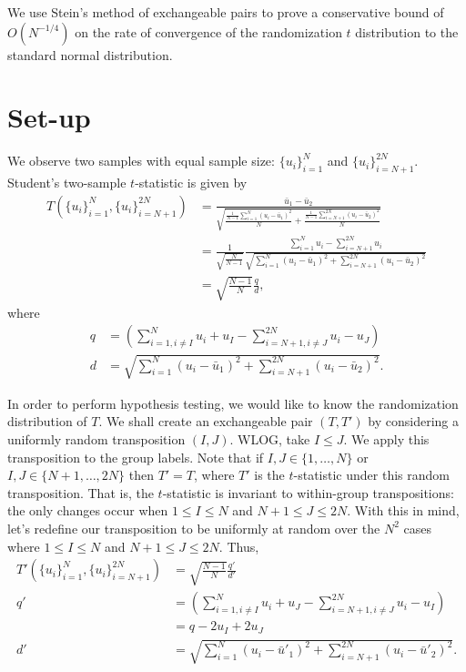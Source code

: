 We use Stein's method of exchangeable pairs to prove a conservative bound of $O(N^{-1/4})$ on the
rate of convergence of the randomization $t$ distribution to the standard normal distribution.

\section{Set-up}
We observe two samples with equal sample size: $\{u_i\}_{i=1}^N$ and $\{u_i\}_{i=N+1}^{2N}$.
Student's two-sample $t$-statistic is given by
\begin{align*}
T(\{u_i\}_{i=1}^N, \{u_i\}_{i=N+1}^{2N}) 
&= \frac{\bar{u}_1 - \bar{u}_2}{\sqrt{\frac{\frac{1}{N-1}
      \sum_{i=1}^N(u_i - \bar{u}_1)^2}{N} + \frac{\frac{1}{N-1}
      \sum_{i=N+1}^{2N}(u_i - \bar{u}_2)^2}{N}}} \\
&= \frac{1}{\sqrt{\frac{N}{N-1}}} \frac{\sum_{i=1}^N u_i -
  \sum_{i=N+1}^{2N}u_i}{\sqrt{\sum_{i=1}^N(u_i - 
    \bar{u}_1)^2 + \sum_{i=N+1}^{2N}(u_i - \bar{u}_2)^2}} \\
&= \sqrt{\frac{N-1}{N}}\frac{q}{d},
\end{align*}
where
\begin{align*}
  q &= \left (\sum_{i=1, i\neq I}^N u_i + u_I -
    \sum_{i=N+1, i\neq J}^{2N}u_i - u_J\right ) \\
  d &= \sqrt{\sum_{i=1}^N(u_i - \bar{u}_1)^2 +
    \sum_{i=N+1}^{2N}(u_i - \bar{u}_2)^2}.
\end{align*}

In order to perform hypothesis testing, we would like to know the randomization distribution of $T$.
We shall create an exchangeable pair $(T, T')$ by considering a uniformly random transposition $(I,
J)$.  WLOG, take $I \leq J$.  We apply this transposition to the group labels.  Note that if $I, J
\in \{1,\ldots,N\}$ or $I, J \in \{N+1,\ldots,2N\}$ then $T' = T$, where $T'$ is the $t$-statistic
under this random transposition.  That is, the $t$-statistic is invariant to within-group
transpositions: the only changes occur when $1 \leq I \leq N$ and $N + 1 \leq J \leq 2N$.
With this in mind, let's redefine our transposition to be uniformly at random over the $N^2$ cases
where $1 \leq I \leq N$ and $N + 1 \leq J \leq 2N$. Thus,
\begin{align*}
  T'(\{u_i\}_{i=1}^N, \{u_i\}_{i=N+1}^{2N}) 
  &= \sqrt{\frac{N-1}{N}}\frac{q'}{d'} \\
  q' &= \left (\sum_{i=1, i\neq I}^N u_i + u_J -
    \sum_{i=N+1, i\neq J}^{2N}u_i - u_I \right ) \\
  &= q - 2u_I + 2u_J \\
  d' &= \sqrt{\sum_{i=1}^N(u_i - \bar{u}'_1)^{2} +
    \sum_{i=N+1}^{2N}(u_i - \bar{u}'_2)^{2}}.  
\end{align*}

